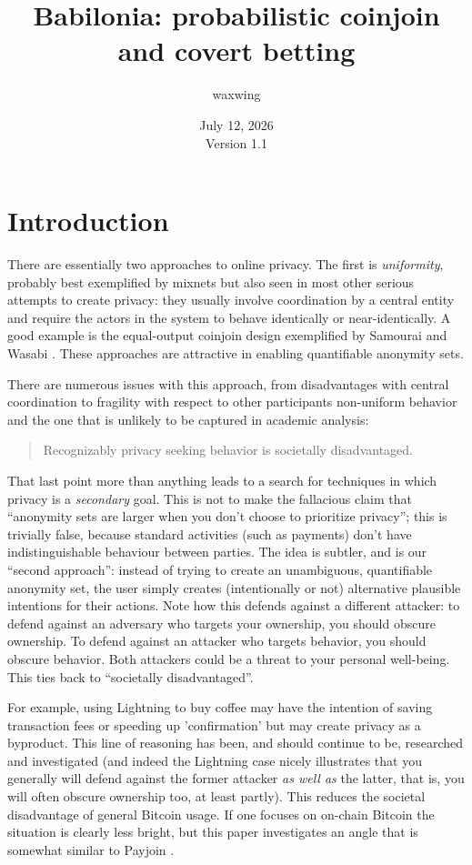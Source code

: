 \documentclass[11pt]{article}
\title{\textbf{Babilonia: probabilistic coinjoin and covert betting}}
\author{waxwing}
\date{July 12, 2026 \\ \medskip Version 1.1}
\begin{document}
\maketitle

\tableofcontents

\section{Introduction}

There are essentially two approaches to online privacy. The first is \emph{uniformity}, probably best exemplified by mixnets \cite{chaum1981} but also seen in most other serious attempts to create privacy: they usually involve coordination by a central entity and require the actors in the system to behave identically or near-identically. A good example is the equal-output coinjoin design exemplified by Samourai and Wasabi \cite{zerolink,wabisabi}. These approaches are attractive in enabling quantifiable anonymity sets.

There are numerous issues with this approach, from disadvantages with central coordination to fragility with respect to other participants non-uniform behavior and the one that is unlikely to be captured in academic analysis:

\begin{quote}
Recognizably privacy seeking behavior is societally disadvantaged.
\end{quote}

That last point more than anything leads to a search for techniques in which privacy is a \emph{secondary} goal. This is not to make the fallacious claim that ``anonymity sets are larger when you don't choose to prioritize privacy''; this is trivially false, because standard activities (such as payments) don't have indistinguishable behaviour between parties. The idea is subtler, and is our ``second approach'': instead of trying to create an unambiguous, quantifiable anonymity set, the user simply creates (intentionally or not) alternative plausible intentions for their actions. Note how this defends against a different attacker: to defend against an adversary who targets your ownership, you should obscure ownership. To defend against an attacker who targets behavior, you should obscure behavior. Both attackers could be a threat to your personal well-being. This ties back to ``societally disadvantaged''.

For example, using Lightning \cite{lightning} to buy coffee may have the intention of saving transaction fees or speeding up 'confirmation' but may create privacy as a byproduct. This line of reasoning has been, and should continue to be, researched and investigated (and indeed the Lightning case nicely illustrates that you generally will defend against the former attacker \emph{as well as} the latter, that is, you will often obscure ownership too, at least partly). This reduces the societal disadvantage of general Bitcoin usage. If one focuses on on-chain Bitcoin the situation is clearly less bright, but this paper investigates an angle that is somewhat similar to Payjoin \cite{payjoin}.
\end{document}
